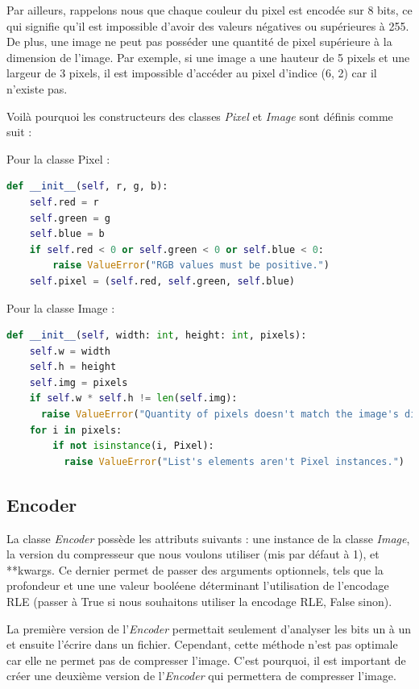 \documentclass[utf8]{article}
\begin{document}
Par ailleurs, rappelons nous que chaque couleur du pixel est encodée sur 8 bits, ce qui signifie qu'il est impossible d'avoir des valeurs négatives ou supérieures à 255. De plus, une image ne peut pas posséder une quantité de pixel supérieure à la dimension de l'image. Par exemple, si une image a une hauteur de 5 pixels et une largeur de 3 pixels, il est impossible d'accéder au pixel d'indice (6, 2) car il n'existe pas.

Voilà pourquoi les constructeurs des classes \textit{Pixel} et \textit{Image} sont définis comme suit :

Pour la classe Pixel : 
\begin{lstlisting}[language=Python, basicstyle=\small]
def __init__(self, r, g, b):
    self.red = r
    self.green = g
    self.blue = b
    if self.red < 0 or self.green < 0 or self.blue < 0:
        raise ValueError("RGB values must be positive.")
    self.pixel = (self.red, self.green, self.blue)
\end{lstlisting}

Pour la classe Image : 

\begin{lstlisting}[language=Python, basicstyle=\small]
 def __init__(self, width: int, height: int, pixels):
    self.w = width
    self.h = height
    self.img = pixels
    if self.w * self.h != len(self.img):
      raise ValueError("Quantity of pixels doesn't match the image's dimension.")
    for i in pixels:
        if not isinstance(i, Pixel):
		  raise ValueError("List's elements aren't Pixel instances.")
\end{lstlisting}

\subsection{Encoder}
La classe \textit{Encoder} possède les attributs suivants : une instance de la classe \textit{Image}, la version du compresseur que nous  voulons utiliser (mis par défaut à 1), et **kwargs. Ce dernier permet de passer des arguments optionnels, tels que la profondeur et une une valeur booléene déterminant l'utilisation de l'encodage RLE (passer à True si nous souhaitons utiliser la encodage RLE, False sinon).

La première version de l'\textit{Encoder} permettait seulement d'analyser les bits un à un et ensuite l'écrire dans un fichier. Cependant, cette méthode n'est pas optimale car elle ne permet pas de compresser l'image. C'est pourquoi, il est important de créer une deuxième version de l'\textit{Encoder} qui permettera  de compresser l'image.
\end{document}
